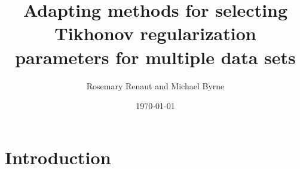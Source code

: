 \documentclass[12pt]{article}
\title{Adapting methods for selecting Tikhonov regularization parameters for multiple data sets}
\author{Rosemary Renaut and Michael Byrne}
\date{\today}
\begin{document}
\maketitle


\section{Introduction} \label{sec:Introduction}
\end{document}
